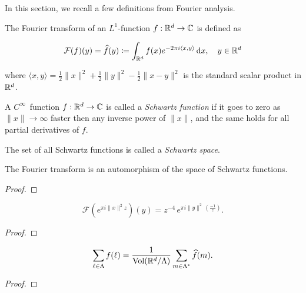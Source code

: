 In this section, we recall a few definitions from Fourier analysis.

\begin{definition}\label{def:Fourier-Transform} %
  The Fourier transform of an $L^1$-function $f:\mathbb{R}^d\to\mathbb{C}$ is defined as

  \[
    \mathcal{F}(f)(y) = \widehat{f}(y) \coloneqq \int_{\mathbb{R}^d} f(x)e^{-2\pi i \langle x, y \rangle} \,\mathrm{d}x, \quad y \in \mathbb{R}^d
  \]

  where $\langle x, y \rangle = \frac12\|x\|^2 + \frac12\|y\|^2 - \frac12\|x - y\|^2$ is the standard scalar product in $\mathbb{R}^d$.
\end{definition}

\begin{definition}\label{def:Schwartz-Function}
A $C^\infty$~function $f:\mathbb{R}^d\to\mathbb{C}$ is called a \emph{Schwartz function} if it goes to zero as $\|x\|\to\infty$ faster then any inverse power of $\|x\|$, and the same holds for all partial derivatives of $f$.
\end{definition}

\begin{definition}\label{def:Schwartz-Space}
    The set of all Schwartz functions is called a \emph{Schwartz space}.
\end{definition}

\begin{lemma}\label{lemma:Fourier-transform-is-automorphism}
  The Fourier transform is an automorphism of the space of Schwartz functions.
\end{lemma}
\begin{proof}
\end{proof}

\begin{lemma}\label{lemma:Gaussian-Fourier}
  \begin{equation}
    \mathcal{F}(e^{\pi i \|x\|^2 z})(y) = z^{-4}\,e^{\pi i \|y\|^2 \,(\frac{-1}{z}) }.
  \end{equation}
\end{lemma}
\begin{proof}
\end{proof}

\begin{theorem}\label{thm:Poisson-summation-formula}
  $$\sum_{\ell\in\Lambda}f(\ell)=\frac{1}{\mathrm{Vol}(\mathbb{R}^d/\Lambda)}\sum_{m\in\Lambda^*}\widehat{f}(m).$$
\end{theorem}
\begin{proof}
\end{proof}
